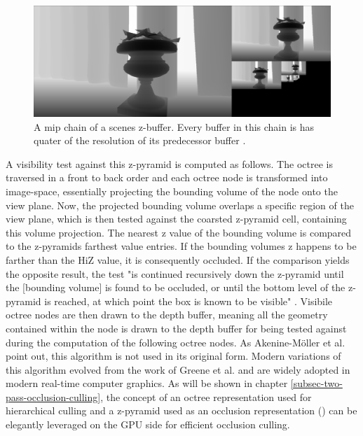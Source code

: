 \begin{figure}[h]
    \centering
    \includegraphics[width=\linewidth]{images/graphics/hiz-mip-chain.png}
    \caption{A mip chain of a scenes z-buffer. Every buffer in this chain is has quater of the resolution of its 
    predecessor buffer \cite{Schachtschabel2017}.}
    \label{fig:hiz-mip-chain}
\end{figure}

\noindent
A visibility test against this z-pyramid is computed as follows. The octree is traversed in a front to back order 
and each octree node is transformed into image-space, essentially projecting the bounding volume of the node onto 
the view plane. Now, the projected bounding volume overlaps a specific region of the view plane, which is then 
tested against the coarsted z-pyramid cell, containing this volume projection. The nearest z value of the bounding 
volume is compared to the z-pyramids farthest value entries. If the bounding volumes z happens to be farther than the 
\ac{HiZ} value, it is consequently occluded. If the comparison yields the opposite result, the test "is continued 
recursively down the z-pyramid until the [bounding volume] is found to be occluded, or until the bottom level of the 
z-pyramid is reached, at which point the box is known to be visible" \cite{AkenineMoeller2018}. Visibile octree nodes 
are then drawn to the depth buffer, meaning all the geometry contained within the node is drawn to the depth buffer 
for being tested against during the computation of the following octree nodes. As Akenine-Möller et al. 
\cite{AkenineMoeller2018} point out, this algorithm is not used in its original form. Modern variations of this 
algorithm evolved from the work of Greene et al. \cite{Greene93} and are widely adopted in modern real-time computer 
graphics. As will be shown in chapter \ref{subsec-two-pass-occlusion-culling}, the concept of an octree representation 
used for hierarchical culling and a z-pyramid used as an occlusion representation (\cite{AkenineMoeller2018}) can be 
elegantly leveraged on the GPU side for efficient occlusion culling.


